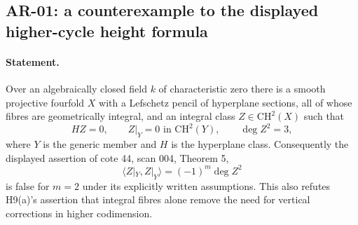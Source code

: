 \documentclass[11pt,a4paper]{article}
\theoremstyle{remark}
\begin{document}
\subsection{AR-01: a counterexample to the displayed higher-cycle height formula}
\label{ar:counterexample}

\paragraph{Statement.}
Over an algebraically closed field $k$ of characteristic zero there is a
smooth projective fourfold $X$ with a Lefschetz pencil of hyperplane sections,
all of whose fibres are geometrically integral, and an integral class
$Z\in\mathrm{CH}^2(X)$ such that
\[
 HZ=0,\qquad Z|_Y=0\text{ in }\mathrm{CH}^2(Y),\qquad \deg Z^2=3,
\]
where $Y$ is the generic member and $H$ is the hyperplane class.  Consequently
the displayed assertion of cote 44, scan 004, Theorem 5,
\[
 \langle Z|_Y,Z|_Y\rangle=(-1)^m\deg Z^2
\]
is false for $m=2$ under its explicitly written assumptions.  This also
refutes H9(a)'s assertion that integral fibres alone remove the need for
vertical corrections in higher codimension.
\end{document}
